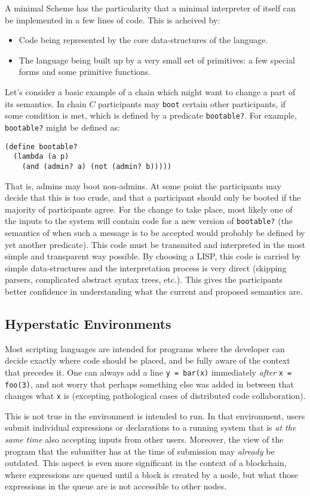A minimal Scheme has the particularity that a minimal interpreter of itself can
be implemented in a few lines of code. This is acheived by:
\begin{itemize}
  \item Code being represented by the core data-structures of the language.
  \item The language being built up by a very small set of primitives: a few
    special forms and some primitive functions.
\end{itemize}
Let's consider a basic example of a chain which might want to change a part of
its semantics. In chain $C$ participants may \texttt{boot} certain other
participants, if some condition is met, which is defined by a predicate
\texttt{bootable?}. For example, \texttt{bootable?} might be defined as:
\begin{verbatim}
(define bootable?
  (lambda (a p)
    (and (admin? a) (not (admin? b)))))
\end{verbatim}
That is, admins may boot non-admins. At some point the participants may decide
that this is too crude, and that a participant should only be booted if the
majority of participants agree. For the change to take place, most likely one of
the inputs to the system will contain code for a new version of
\texttt{bootable?} (the semantics of when such a message is to be accepted would
probably be defined by yet another predicate). This code must be transmited and
interpreted in the most simple and transparent way possible. By choosing a LISP,
this code is carried by simple data-structures and the interpretation process is
very direct (skipping parsers, complicated abstract syntax trees, etc.). This
gives the participants better confidence in understanding what the current and
proposed semantics are.

\subsection{Hyperstatic Environments}
\label{s:hyperstatic}

Most scripting languages are intended for programs where the developer can
decide exactly where code should be placed, and be fully aware of the context
that precedes it. One can always add a line \texttt{y = bar(x)} immediately
\emph{after} \texttt{x = foo(3)}, and not worry that perhaps something else was
added in between that changes what \texttt{x} is (excepting pathological cases
of distributed code collaboration).

This is not true in the environment \rad is intended to run. In that
environment, users submit individual expressions or declarations to a running
system that is \emph{at the same time} also accepting inputs from other
users. Moreover, the view of the program that the submitter has at the time of
submission may \emph{already} be outdated. This aspect is even more significant
in the context of a blockchain, where expressions are queued until a block is
created by a node, but what those expressions in the queue are is not
accessible to other nodes.

